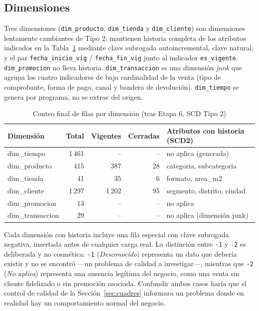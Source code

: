 \documentclass[11pt,a4paper]{article}
\begin{document}
\subsection{Dimensiones}

Tres dimensiones (\texttt{dim\_producto}, \texttt{dim\_tienda} y \texttt{dim\_cliente}) son dimensiones lentamente cambiantes de Tipo 2: mantienen historia completa de los atributos indicados en la Tabla~\ref{tab:dimensiones} mediante clave subrogada autoincremental, clave natural, y el par \texttt{fecha\_inicio\_vig} / \texttt{fecha\_fin\_vig} junto al indicador \texttt{es\_vigente}. \texttt{dim\_promocion} no lleva historia. \texttt{dim\_transaccion} es una dimensión \emph{junk} que agrupa los cuatro indicadores de baja cardinalidad de la venta (tipo de comprobante, forma de pago, canal y bandera de devolución). \texttt{dim\_tiempo} se genera por programa, no se extrae del origen.

\begin{table}[h!]
\centering
\caption{Conteo final de filas por dimensión (tras Etapa 6, SCD Tipo 2)}
\label{tab:dimensiones}
\begin{tabular}{lrrrl}
\toprule
\textbf{Dimensión} & \textbf{Total} & \textbf{Vigentes} & \textbf{Cerradas} & \textbf{Atributos con historia (SCD2)} \\
\midrule
dim\_tiempo      & 1\,461 & --    & --  & no aplica (generada) \\
dim\_producto    & 415    & 387   & 28  & categoria, subcategoria \\
dim\_tienda      & 41     & 35    & 6   & formato, area\_m2 \\
dim\_cliente     & 1\,297 & 1\,202 & 95 & segmento, distrito, ciudad \\
dim\_promocion   & 13     & --    & --  & no aplica \\
dim\_transaccion & 29     & --    & --  & no aplica (dimensión junk) \\
\bottomrule
\end{tabular}
\end{table}

Cada dimensión con historia incluye una fila especial con clave subrogada negativa, insertada antes de cualquier carga real. La distinción entre \texttt{-1} y \texttt{-2} es deliberada y no cosmética: \texttt{-1} (\emph{Desconocido}) representa un dato que debería existir y no se encontró —un problema de calidad a investigar—, mientras que \texttt{-2} (\emph{No aplica}) representa una ausencia legítima del negocio, como una venta sin cliente fidelizado o sin promoción asociada. Confundir ambos casos haría que el control de calidad de la Sección~\ref{sec:cuadres} informara un problema donde en realidad hay un comportamiento normal del negocio.
\end{document}
